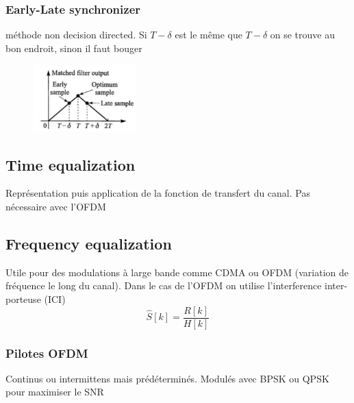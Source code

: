 \documentclass[resume]{subfiles}
\begin{document}
\subsubsection{Early-Late synchronizer}
méthode non decision directed. Si $T-\delta$ est le même que $T-\delta$ on se trouve au bon endroit, sinon il faut bouger
\begin{figure}[H]
\centering
\includegraphics[width=4.00cm]{img_2.png}
\end{figure}
\subsection{Time equalization}
Représentation puis application de la fonction de transfert du canal. Pas nécessaire avec l'OFDM
\subsection{Frequency equalization}
Utile pour des modulations à large bande comme CDMA ou OFDM (variation de fréquence le long du canal). Dans le cas de l'OFDM on utilise l'interference inter-porteuse (ICI)
$$\hat{S}[k]=\frac{R[k]}{H[k]}$$
\subsubsection{Pilotes OFDM}
Continus ou intermittens mais prédéterminés. Modulés avec BPSK ou QPSK pour maximiser le SNR
\end{document}
